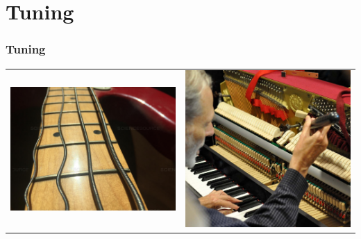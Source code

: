 \documentclass[12pt]{beamer}
\begin{document}
    \section{Tuning}
        \begin{frame}
            \frametitle{Tuning}
            \begin{center}
                \begin{tabular}{c c}
                    \includegraphics[scale=0.125]{stringvibration} & \includegraphics[scale=0.290]{pianotuning}
                \end{tabular}
            \end{center}
        \end{frame}
\end{document}
